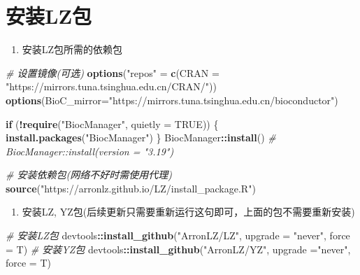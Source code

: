 \documentclass[
]{book}
\newenvironment{Shaded}{\begin{snugshade}}{\end{snugshade}}
\newcommand{\AttributeTok}[1]{\textcolor[rgb]{0.13,0.29,0.53}{#1}}
\newcommand{\CommentTok}[1]{\textcolor[rgb]{0.56,0.35,0.01}{\textit{#1}}}
\newcommand{\ConstantTok}[1]{\textcolor[rgb]{0.56,0.35,0.01}{#1}}
\newcommand{\ControlFlowTok}[1]{\textcolor[rgb]{0.13,0.29,0.53}{\textbf{#1}}}
\newcommand{\FunctionTok}[1]{\textcolor[rgb]{0.13,0.29,0.53}{\textbf{#1}}}
\newcommand{\NormalTok}[1]{#1}
\newcommand{\OtherTok}[1]{\textcolor[rgb]{0.56,0.35,0.01}{#1}}
\newcommand{\SpecialCharTok}[1]{\textcolor[rgb]{0.81,0.36,0.00}{\textbf{#1}}}
\newcommand{\StringTok}[1]{\textcolor[rgb]{0.31,0.60,0.02}{#1}}
\providecommand{\tightlist}{%
  \setlength{\itemsep}{0pt}\setlength{\parskip}{0pt}}
\begin{document}
\section{安装LZ包}\label{ux5b89ux88c5lzux5305}

\begin{enumerate}
\def\labelenumi{\arabic{enumi}.}
\tightlist
\item
  安装LZ包所需的依赖包
\end{enumerate}

\begin{Shaded}
\begin{Highlighting}[]
\CommentTok{\# 设置镜像(可选)}
\FunctionTok{options}\NormalTok{(}\StringTok{"repos"} \OtherTok{=} \FunctionTok{c}\NormalTok{(}\AttributeTok{CRAN =} \StringTok{"https://mirrors.tuna.tsinghua.edu.cn/CRAN/"}\NormalTok{)) }
\FunctionTok{options}\NormalTok{(}\AttributeTok{BioC\_mirror=}\StringTok{"https://mirrors.tuna.tsinghua.edu.cn/bioconductor"}\NormalTok{)}

\ControlFlowTok{if}\NormalTok{ (}\SpecialCharTok{!}\FunctionTok{require}\NormalTok{(}\StringTok{"BiocManager"}\NormalTok{, }\AttributeTok{quietly =} \ConstantTok{TRUE}\NormalTok{)) \{}
  \FunctionTok{install.packages}\NormalTok{(}\StringTok{"BiocManager"}\NormalTok{) \}}
\NormalTok{BiocManager}\SpecialCharTok{::}\FunctionTok{install}\NormalTok{() }\CommentTok{\# BiocManager::install(version = "3.19")}

\CommentTok{\# 安装依赖包(网络不好时需使用代理)}
\FunctionTok{source}\NormalTok{(}\StringTok{"https://arronlz.github.io/LZ/install\_package.R"}\NormalTok{)}
\end{Highlighting}
\end{Shaded}

\begin{enumerate}
\def\labelenumi{\arabic{enumi}.}
\setcounter{enumi}{1}
\tightlist
\item
  安装LZ, YZ包(后续更新只需要重新运行这句即可，上面的包不需要重新安装)
\end{enumerate}

\begin{Shaded}
\begin{Highlighting}[]
\CommentTok{\# 安装LZ包}
\NormalTok{devtools}\SpecialCharTok{::}\FunctionTok{install\_github}\NormalTok{(}\StringTok{"ArronLZ/LZ"}\NormalTok{, }\AttributeTok{upgrade =} \StringTok{"never"}\NormalTok{, }\AttributeTok{force =}\NormalTok{ T)}
\CommentTok{\# 安装YZ包}
\NormalTok{devtools}\SpecialCharTok{::}\FunctionTok{install\_github}\NormalTok{(}\StringTok{"ArronLZ/YZ"}\NormalTok{, }\AttributeTok{upgrade =}\StringTok{"never"}\NormalTok{, }\AttributeTok{force =}\NormalTok{ T)}
\end{Highlighting}
\end{Shaded}
\end{document}
